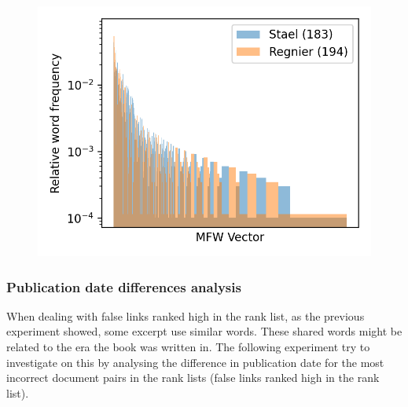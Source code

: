 \begin{figure}
  \label{fig:mfw_vector_last_rl}
  \includegraphics[width=\linewidth]{img/mfw_vector_last_rl.png}
\end{figure}

\subsubsection{Publication date differences analysis}

When dealing with false links ranked high in the rank list, as the previous experiment showed, some excerpt use similar words.
These shared words might be related to the era the book was written in.
The following experiment try to investigate on this by analysing the difference in publication date for the most incorrect document pairs in the rank lists (false links ranked high in the rank list).

